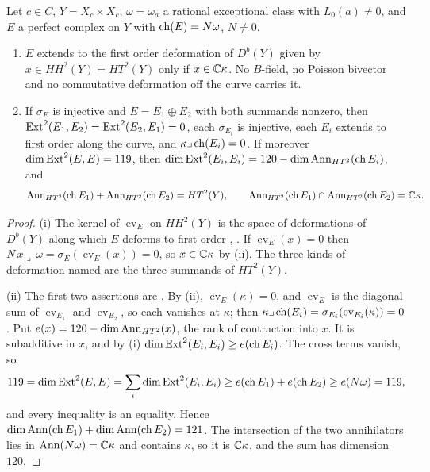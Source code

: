 \begin{corollary}
\label{cor:mumfordsplit}
Let $c\in C$, $Y=X_{c}\times X_{c}$, $\omega=\omega_{a}$ a rational
exceptional class with $L_{0}(a)\ne0$, and $E$ a perfect complex on $Y$ with
$\operatorname{ch}(E)=N\omega$, $N\ne0$.
\begin{enumerate}[label=\textup{(\roman*)},leftmargin=2.6em,itemsep=2pt]
\item $E$ extends to the first order deformation of $D^{b}(Y)$ given by
  $x\in HH^{2}(Y)=HT^{2}(Y)$ only if $x\in\mathbb{C}\kappa$. No $B$-field, no
  Poisson bivector and no commutative deformation off the curve carries it.
\item If $\sigma_{E}$ is injective and $E=E_{1}\oplus E_{2}$ with both
  summands nonzero, then $\operatorname{Ext}^{2}(E_{1},E_{2})=\operatorname{Ext}^{2}(E_{2},E_{1})=0$, each
  $\sigma_{E_{i}}$ is injective, each $E_{i}$ extends to first order along the
  curve, and $\kappa\lrcorner\operatorname{ch}(E_{i})=0$. If moreover
  $\dim\operatorname{Ext}^{2}(E,E)=119$, then $\dim\operatorname{Ext}^{2}(E_{i},E_{i})=
  120-\dim\operatorname{Ann}_{HT^{2}}(\operatorname{ch} E_{i})$, and
  \[
    \operatorname{Ann}_{HT^{2}}(\operatorname{ch} E_{1})+\operatorname{Ann}_{HT^{2}}(\operatorname{ch} E_{2})=HT^{2}(Y),\qquad
    \operatorname{Ann}_{HT^{2}}(\operatorname{ch} E_{1})\cap\operatorname{Ann}_{HT^{2}}(\operatorname{ch} E_{2})=\mathbb{C}\kappa .
  \]
\end{enumerate}
\end{corollary}

\begin{proof}
(i) The kernel of $\operatorname{ev}_{E}$ on $HH^{2}(Y)$ is the space of
deformations of $D^{b}(Y)$ along which $E$ deforms to first order
\cite{Tod09}, \cite[Section~8.3]{Mar25a}. If $\operatorname{ev}_{E}(x)=0$ then
$N\,x\lrcorner\,\omega=\sigma_{E}(\operatorname{ev}_{E}(x))=0$, so
$x\in\mathbb{C}\kappa$ by (ii). The three kinds of
deformation named are the three summands of $HT^{2}(Y)$.

(ii) The first two assertions are . By
(ii), $\operatorname{ev}_{E}(\kappa)=0$, and
$\operatorname{ev}_{E}$ is the diagonal sum of $\operatorname{ev}_{E_{1}}$
and $\operatorname{ev}_{E_{2}}$, so each vanishes at $\kappa$; then
$\kappa\lrcorner\operatorname{ch}(E_{i})=\sigma_{E_{i}}(\operatorname{ev}_{E_{i}}(\kappa))
=0$. Put $e(x)=120-\dim\operatorname{Ann}_{HT^{2}}(x)$, the rank of contraction into $x$.
It is subadditive in $x$, and by (i)
$\dim\operatorname{Ext}^{2}(E_{i},E_{i})\ge e(\operatorname{ch} E_{i})$. The cross terms vanish, so
\[
  119=\dim\operatorname{Ext}^{2}(E,E)=\sum_{i}\dim\operatorname{Ext}^{2}(E_{i},E_{i})
  \ge e(\operatorname{ch} E_{1})+e(\operatorname{ch} E_{2})\ge e(N\omega)=119,
\]
and every inequality is an equality. Hence
$\dim\operatorname{Ann}(\operatorname{ch} E_{1})+\dim\operatorname{Ann}(\operatorname{ch} E_{2})=121$. The intersection of the two
annihilators lies in $\operatorname{Ann}(N\omega)=\mathbb{C}\kappa$ and contains $\kappa$, so it is
$\mathbb{C}\kappa$, and the sum has dimension $120$.
\end{proof}

